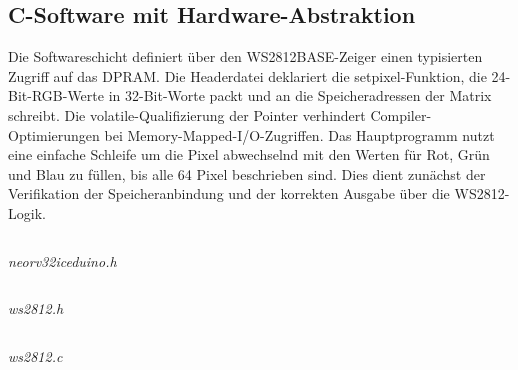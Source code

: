 \inputminted[linenos,frame=single,fontsize=\footnotesize, firstline=163, lastline=248, breaklines]{vhdl}{A9_Abgabe/iceduino_setup/osflow/boards/iceduino/neorv32_iceduino_top.vhd}

\newpage

\inputminted[linenos,frame=single,fontsize=\footnotesize, firstline=425, lastline=449]{vhdl}{A9_Abgabe/iceduino_setup/osflow/boards/iceduino/neorv32_iceduino_top.vhd}

\subsection{C-Software mit Hardware-Abstraktion}

Die Softwareschicht definiert über den WS2812\textunderscore BASE-Zeiger einen typisierten Zugriff 
auf das DPRAM. Die Headerdatei deklariert die set\textunderscore pixel-Funktion, die 24-Bit-RGB-Werte 
in 32-Bit-Worte packt und an die Speicheradressen der Matrix schreibt. 
Die volatile-Qualifizierung der Pointer verhindert Compiler-Optimierungen bei 
Memory-Mapped-I/O-Zugriffen. Das Hauptprogramm nutzt eine einfache Schleife um die Pixel 
abwechselnd mit den Werten für Rot, Grün und Blau zu füllen, bis alle 64 Pixel beschrieben sind. Dies dient 
zunächst der Verifikation der Speicheranbindung und der korrekten Ausgabe über die WS2812-Logik.


\inputminted[linenos,frame=single,fontsize=\footnotesize, firstline=83, lastline=86]{c}{A9_Abgabe/iceduino_setup/sw/lib/include/neorv32_iceduino.h}
\vspace{-8mm}
\begin{center}
\footnotesize\textit{neorv32\textunderscore iceduino.h}
\end{center}
\vspace{4mm}

\newpage

\inputminted[linenos,frame=single,fontsize=\footnotesize]{c}{A9_Abgabe/iceduino_setup/sw/lib/include/ws2812.h}
\vspace{-8mm}
\begin{center}
\footnotesize\textit{ws2812.h}
\end{center}
\vspace{4mm}

\inputminted[linenos,frame=single,fontsize=\footnotesize]{c}{A9_Abgabe/iceduino_setup/sw/lib/source/ws2812.c}
\vspace{-8mm}
\begin{center}
\footnotesize\textit{ws2812.c}
\end{center}
\vspace{4mm}

